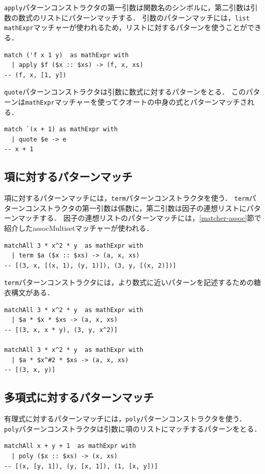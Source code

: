 \lstinline{apply}パターンコンストラクタの第一引数は関数名のシンボルに，第二引数は引数の数式のリストにパターンマッチする．
引数のパターンマッチには，\lstinline{list mathExpr}マッチャーが使われるため，リストに対するパターンを使うことができる．
\begin{lstlisting}[language=egison,numbers=none]
match ('f x 1 y)  as mathExpr with
  | apply $f ($x :: $xs) -> (f, x, xs)
-- (f, x, [1, y])
\end{lstlisting}

\lstinline{quote}パターンコンストラクタは引数に数式に対するパターンをとる．
このパターンは\lstinline{mathExpr}マッチャーを使ってクオートの中身の式とパターンマッチされる．
\begin{lstlisting}[language=egison,numbers=none,escapechar=']
match `(x + 1) as mathExpr with
  | quote $e -> e
-- x + 1
\end{lstlisting}


\subsection{項に対するパターンマッチ}

項に対するパターンマッチには，\lstinline{term}パターンコンストラクタを使う．
\lstinline{term}パターンコンストラクタの第一引数は係数に，第二引数は因子の連想リストにパターンマッチする．
因子の連想リストのパターンマッチには，\ref{matcher-assoc}節で紹介したassocMultisetマッチャーが使われる．
\begin{lstlisting}[language=egison,numbers=none]
matchAll 3 * x^2 * y  as mathExpr with
  | term $a ($x :: $xs) -> (a, x, xs)
-- [(3, x, [(x, 1), (y, 1)]), (3, y, [(x, 2)])]
\end{lstlisting}

\lstinline{term}パターンコンストラクタには，より数式に近いパターンを記述するための糖衣構文がある．
\begin{lstlisting}[language=egison,numbers=none]
matchAll 3 * x^2 * y  as mathExpr with
  | $a * $x * $xs -> (a, x, xs)
-- [(3, x, x * y), (3, y, x^2)]

matchAll 3 * x^2 * y  as mathExpr with
  | $a * $x^#2 * $xs -> (a, x, xs)
-- [(3, x, y)]
\end{lstlisting}

\subsection{多項式に対するパターンマッチ}

有理式に対するパターンマッチには，\lstinline{poly}パターンコンストラクタを使う．
\lstinline{poly}パターンコンストラクタは引数に項のリストにマッチするパターンをとる．
\begin{lstlisting}[language=egison,numbers=none]
matchAll x + y + 1  as mathExpr with
  | poly ($x :: $xs) -> (x, xs)
-- [(x, [y, 1]), (y, [x, 1]), (1, [x, y])]
\end{lstlisting}


